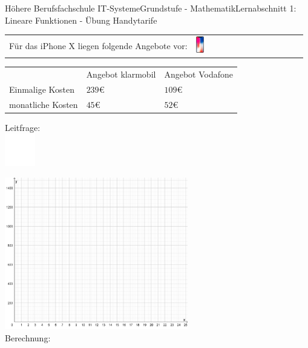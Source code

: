 \documentclass[oneside,openany,headings=optiontotoc,11pt,numbers=noenddot]{scrreprt}
\begin{document}
\begin{worksheet}{Höhere Berufsfachschule IT-Systeme}{Grundstufe - Mathematik}{Lernabschnitt 1: Lineare Funktionen - Übung}
		\setcounter{page}{1}
		\noindent
		\LARGE Handytarife\\
		\normalsize
		\noindent
		\begin{tabularx}{\textwidth}{Xl}
			\noindent
			Für das iPhone X liegen folgende Angebote vor: & \multirow{4}{*}{\includegraphics[width=0.08\textwidth]{../99_Bilder/iphox.png}}
		\end{tabularx}
		\begin{tabularx}{\textwidth}{|l|l|l|}
			\cline{1-3}
			& Angebot klarmobil & Angebot Vodafone\\
			\cline{1-3}
			Einmalige Kosten & \(239\)\euro{} & \(109\)\euro{}\\
			\cline{1-3}
			monatliche Kosten & \(45\)\euro{} & \(52\)\euro{}\\
			\cline{1-3}
		\end{tabularx}
		\begin{framed}
			\noindent
			\small{\color{codegray}Leitfrage:}\\
			\includegraphics[width=0.1\textwidth]{../../empty.jpg}\\
		\end{framed}
		\begin{framed}
			\noindent
			\includegraphics[width=0.6\textwidth]{../99_Bilder/KoordLeerSkal.png}\\
			\small{\color{codegray}Berechnung:}\\
			\begin{tabularx}{\textwidth}{X|L{3cm}|}

\end{tabularx}
\end{framed}
\end{worksheet}
\end{document}
